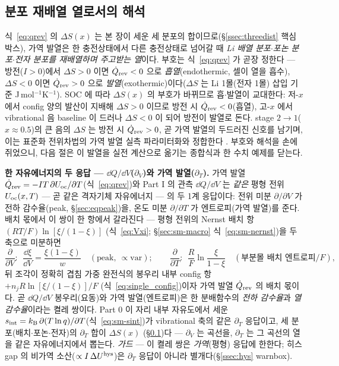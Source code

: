 \subsection{분포 재배열 열로서의 해석}\label{ssec:revinterp}
식~\eqref{eq:qrev} 의 $\Delta S(x)$ 는 본 장이 세운 세 분포의 합이므로(\S\ref{ssec:threedist} 핵심 박스),
가역 발열은 한 충전상태에서 다른 충전상태로 넘어갈 때 \emph{Li 배열 분포$\cdot$포논 분포$\cdot$전자 분포를
재배열하며 주고받는 열}이다. 부호는 식~\eqref{eq:qrev} 가 곧장 정한다 --- 방전($I>0$)에서 $\Delta S>0$ 이면
$\dot Q_{\mathrm{rev}}<0$ 으로 \emph{흡열}(endothermic, 셀이 열을 흡수), $\Delta S<0$ 이면 $\dot Q_{\mathrm{rev}}>0$ 으로
\emph{발열}(exothermic)이다($\Delta S$ 는 Li 1몰(전자 1몰) 삽입 기준 J\,mol$^{-1}$K$^{-1}$). SOC 에 따라
$\Delta S(x)$ 의 부호가 바뀌므로 흡$\cdot$발열이 교대한다: 저-$x$ 에서 config 양의 발산이 지배해 $\Delta S>0$
이므로 방전 시 $\dot Q_{\mathrm{rev}}<0$(흡열), 고-$x$ 에서 vibrational 음 baseline 이 드러나 $\Delta S<0$ 이 되어 방전이
발열로 돈다. stage $2\to1$($x\approx0.5$)의 큰 음의 $\Delta S$ 는 방전 시 $\dot Q_{\mathrm{rev}}>0$, 곧 가역 발열의
두드러진 신호를 남기며, 이는 표준화 전위차법의 가역 발열 실측 파라미터화와 정합한다 \cite{standardised2024}. 부호와
해석을 손에 쥐었으니, 다음 절은 이 발열을 실전 계산으로 옮기는 종합식과 한 수치 예제를 닫는다.

\begin{bgbox}
\textbf{한 자유에너지의 두 응답 --- $\dd Q/\dd V$($\partial_V$)와 가역 발열($\partial_T$).} 가역 발열
$\dot Q_{\mathrm{rev}}=-IT\,\partial U_{\mathrm{oc}}/\partial T$(식~\eqref{eq:qrev})와 Part I 의 관측 $\dd Q/\dd V$ 는 \emph{같은}
평형 전위 $U_{\mathrm{oc}}(x,T)$ --- 곧 같은 격자기체 자유에너지 --- 의 두 1계 응답이다: 전위 미분 $\partial/\partial V$
가 전하 감수율(peak, \S\ref{sec:eqpeak})을, 온도 미분 $\partial/\partial T$ 가 엔트로피(가역 발열)를 준다. 배치
몫에서 이 쌍이 한 항에서 갈라진다 --- 평형 전위의 Nernst 배치 항 $(RT/F)\ln[\xi/(1-\xi)]$
(식~\eqref{eq:Vxi}; \S\ref{sec:sm-macro} 식~\eqref{eq:sm-nernst})을 두 축으로 미분하면
\[
\frac{\partial}{\partial V}:\ \ \frac{\dd\xi}{\dd V}=\frac{\xi(1-\xi)}{w}\quad(\text{peak},\ \propto\mathrm{var});
\qquad
\frac{\partial}{\partial T}:\ \ \frac{R}{F}\ln\frac{\xi}{1-\xi}\quad(\text{부분몰 배치 엔트로피}/F),
\]
뒤 조각이 정확히 겹침 가중 완전식의 봉우리 내부 config 항 $+n_jR\ln[\xi/(1-\xi)]/F$
(식~\eqref{eq:single_config})이자 가역 발열 $\dot Q_{\mathrm{rev}}$ 의 배치 몫이다. 곧 $\dd Q/\dd V$ 봉우리(요동)와 가역
발열(엔트로피)은 한 분배함수의 \emph{전하 감수율}과 \emph{열 감수율}이라는 켤레 쌍이다. Part 0 이 자리 내부
자유도에서 세운 $s_\mathrm{int}=k_{\mathrm B}\,\partial(T\ln q)/\partial T$(식~\eqref{eq:sm-sint})가 vibrational 축의
같은 $\partial_T$ 응답이고, 세 분포(배치$\cdot$포논$\cdot$전자)의 $\partial_T$ 합이 $\Delta S(x)$
(\S\ref{ssec:revinterp})다 --- $\partial_V$ 는 곡선을, $\partial_T$ 는 그 곡선의 열을 같은 자유에너지에서
뽑는다. \emph{가드} --- 이 켤레 쌍은 \emph{가역}(평형) 응답에 한한다; 히스 gap 의 비가역
소산($\propto I\,\Delta U^{\mathrm{hys}}$)은 $\partial_T$ 응답이 아니라 별개다(\S\ref{ssec:hys} warnbox).
\end{bgbox}


